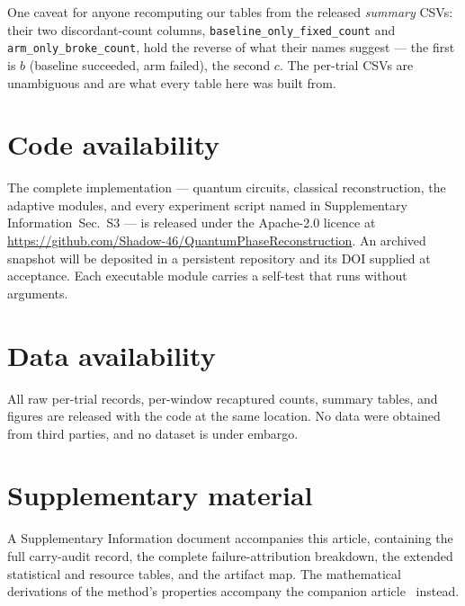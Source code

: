 \documentclass[preprint,11pt]{elsarticle}
\newcommand{\SI}{Supplementary Information}
\newcommand{\SIartifacts}{\SI{}~Sec.~S3}
\begin{document}
One caveat for anyone recomputing our tables from the released \emph{summary}
CSVs: their two discordant-count columns,
\texttt{baseline\_only\_fixed\_count} and \texttt{arm\_only\_broke\_count},
hold the reverse of what their names suggest --- the first is $b$ (baseline
succeeded, arm failed), the second $c$. The per-trial CSVs are unambiguous
and are what every table here was built from.

\section*{Code availability}
The complete implementation --- quantum circuits, classical reconstruction,
the adaptive modules, and every experiment script named in \SIartifacts{} ---
is released under the Apache-2.0 licence at
\url{https://github.com/Shadow-46/QuantumPhaseReconstruction}. An archived
snapshot will be deposited in a persistent repository and its DOI supplied
at acceptance. Each executable module carries a self-test that runs without
arguments.

\section*{Data availability}
All raw per-trial records, per-window recaptured counts, summary tables, and
figures are released with the code at the same location. No data were
obtained from third parties, and no dataset is under embargo.

\section*{Supplementary material}
A Supplementary Information document accompanies this article, containing
the full carry-audit record, the complete failure-attribution breakdown, the
extended statistical and resource tables, and the artifact map. The
mathematical derivations of the method's properties accompany the companion
article~\cite{methodpaper} instead.



\end{document}
